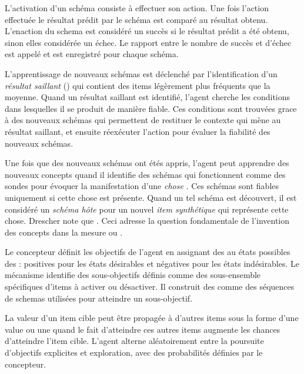 L'activation d'un schéma consiste à effectuer son action.
Une fois l'action effectuée le résultat prédit par le schéma est comparé au résultat obtenu. 
L'enaction du schema est considéré un succès si le résultat prédit a été obtenu, sinon elles considérée un échec. 
Le rapport entre le nombre de succès et d'échec est appelé  et est enregistré pour chaque schéma.  

L'apprentissage de nouveaux schémas est déclenché par l'identification d'un \textit{résultat saillant} () qui contient des items légèrement plus fréquents que la moyenne. 
Quand un résultat saillant est identifié, l'agent cherche les conditions dans lesquelles il se produit de manière fiable.
Ces conditions sont trouvées grace à des nouveaux schémas qui permettent de restituer le contexte qui mène au résultat saillant, et ensuite réexécuter l'action pour évaluer la fiabilité des nouveaux schémas.

Une fois que des nouveaux schémas ont étés appris, l'agent peut apprendre des nouveaux \og concepts \fg quand il identifie des schémas qui fonctionnent comme des \og sondes \fg pour évoquer la manifestation d'une \og \textit{chose} \fg.
Ces schémas sont fiables uniquement si cette chose est présente. 
Quand un tel schéma est découvert, il est considéré un \textit{schéma hôte} pour un nouvel \textit{item synthétique} qui représente cette chose.
Drescher note que \og {} \fg \cite[p.~83]{drescher_made-up_1991}.
Ceci adresse la question fondamentale de l'invention des concepts dans la mesure ou \og {} \fg \cite[p.~81]{drescher_made-up_1991}. 

Le concepteur définit les objectifs de l'agent en assignant des  au états possibles des : positives pour les états désirables et négatives pour les états indésirables.
Le mécanisme identifie des sous-objectifs définis comme des sous-ensemble spécifiques d'items à activer ou désactiver. 
Il construit des  comme des séquences de schemas utilisées pour atteindre un sous-objectif. 

La valeur d'un item cible peut être propagée à d'autres items sous la forme d'une  value ou une  quand le fait d'atteindre ces autres items augmente les chances d'atteindre l'item cible.
L'agent alterne aléatoirement entre la poursuite d'objectifs explicites et exploration, avec des probabilités définies par le concepteur.

